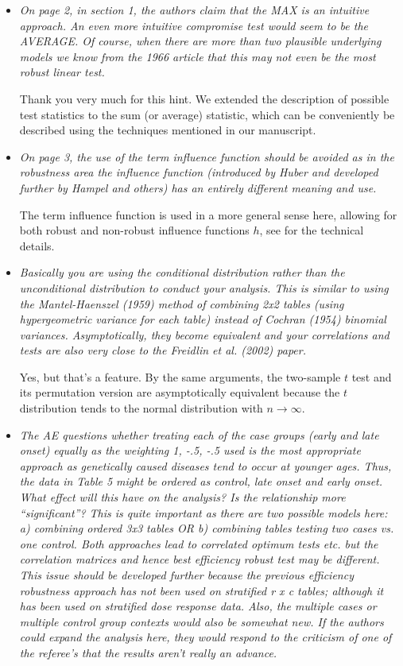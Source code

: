 \documentclass{article}
\begin{document}
\begin{itemize}
\item
\textit{
On page 2, in section 1, the authors claim that the MAX is an intuitive approach. An
even more intuitive compromise test would seem to be the AVERAGE. Of course, when
there are more than two plausible underlying models we know from the 1966 article that
this may not even be the most robust linear test.}

Thank you very much for this hint. We extended the description of possible
test statistics to the sum (or average) statistic, which can be conveniently
be described using the techniques mentioned in our manuscript.

\item
\textit{On page 3, the use of the term influence function should be avoided as in the
robustness area the influence function (introduced by Huber and developed further by
Hampel and others) has an entirely different meaning and use.}

The term influence function is used in a more general sense here,
allowing for both robust and non-robust influence functions $h$, see
\cite{StrasserWeber1999} for the technical details.

\item 
\textit{Basically you are using the conditional distribution rather than the unconditional
distribution to conduct your analysis. This is similar to using the Mantel-Haenszel (1959)
method of combining 2x2 tables (using hypergeometric variance for each table) instead
of Cochran (1954) binomial variances. Asymptotically, they become equivalent and your
correlations and tests are also very close to the Freidlin et al. (2002)
paper.}

Yes, but that's a feature. By the same arguments, the two-sample $t$ test and
its permutation version are asymptotically equivalent because the
$t$ distribution tends to the normal distribution with $n \rightarrow
\infty$.

\item
\textit{The AE questions whether treating each of the case groups (early and late onset)
equally as the weighting 1, -.5, -.5 used is the most appropriate approach as genetically
caused diseases tend to occur at younger ages. Thus, the data in Table 5 might be ordered
as control, late onset and early onset. What effect will this have on the analysis? Is the
relationship more “significant”? This is quite important as there are two possible models
here: a) combining ordered 3x3 tables OR b) combining tables testing two cases vs. one
control. Both approaches lead to correlated optimum tests etc. but the correlation matrices
and hence best efficiency robust test may be different. This issue should be developed
further because the previous efficiency robustness approach has not been used on
stratified r x c tables; although it has been used on stratified dose response data. Also, the
multiple cases or multiple control group contexts would also be somewhat new. If the
authors could expand the analysis here, they would respond to the criticism of one of the
referee’s that the results aren’t really an advance.}


\end{itemize}
\end{document}
